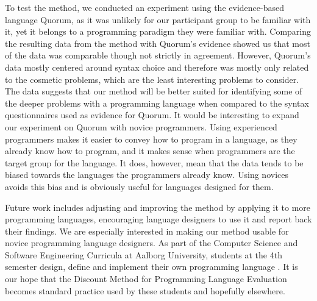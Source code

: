 \documentclass[10pt]{sigplanconf}
\begin{document}
To test the method, we conducted an experiment using the evidence-based language Quorum, as it was unlikely for our participant group to be familiar with it, yet it belongs to a programming paradigm they were familiar with.
Comparing the resulting data from the method with Quorum’s evidence showed us that most of the data was comparable though not strictly in agreement.
However, Quorum’s data mostly centered around syntax choice and therefore was mostly only related to the cosmetic problems, which are the least interesting problems to consider.
The data suggests that our method will be better suited for identifying some of the deeper problems with a programming language when compared to the syntax questionnaires used as evidence for Quorum.
It would be interesting to expand our experiment on Quorum with novice programmers.
Using experienced programmers makes it easier to convey how to program in a language, as they already know how to program, and it  makes sense when programmers are the target group for the language.
It does, however, mean that the data tends to be biased towards the languages the programmers already know. Using novices avoids this bias and is obviously useful for languages designed for them.





Future work includes adjusting and improving the method by applying it to more programming languages, encouraging language designers to use it and report back their findings.
We are especially interested in making our method usable for novice programming language designers. 
As part of the Computer Science and Software Engineering Curricula at Aalborg University, students at the 4th semester design, define and implement their own programming language \cite{toce2016}. It is our hope that the Discount Method for Programming Language Evaluation becomes standard practice used by these students and hopefully elsewhere.
\end{document}
